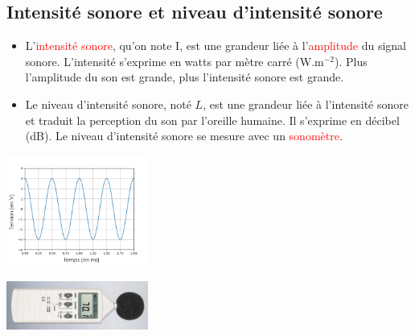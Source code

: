 \subsection{Intensité sonore et niveau d'intensité sonore}
\begin{tcolorbox}[colback=green!5!white,colframe=green!75!black,title=\textbf{Définition :}]
\begin{multicols}{2}
\begin{itemize}[label=\textbullet]
    \item L'\textcolor{red}{intensité sonore}, qu'on note I, est une grandeur liée à l'\textcolor{red}{amplitude} du signal sonore. L'intensité s'exprime en watts par mètre carré (W.m$^{-2}$). Plus l'amplitude du son est grande, plus l'intensité sonore est grande.
    \item Le niveau d'intensité sonore, noté $L$, est une grandeur liée à l'intensité sonore et traduit la perception du son par l'oreille humaine. Il s'exprime en décibel (dB). Le niveau d'intensité sonore se mesure avec un \textcolor{red}{sonomètre}.
    \end{itemize}

\begin{center}
    \includegraphics[width=0.35\textwidth]{Images/Cours/Chapitre_3/Signal_diapason.PNG}
\end{center}
\begin{center}
    \includegraphics[width=0.35\textwidth]{Images/Cours/Chapitre_3/Sonometre.PNG}
\end{center}
\end{multicols}
\end{tcolorbox}

